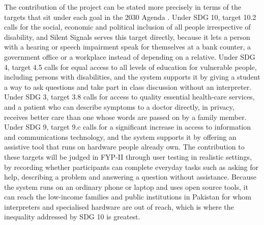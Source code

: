 \documentclass{FastFyp}
\begin{document}
The contribution of the project can be stated more precisely in terms of the targets that sit under each goal in the 2030 Agenda \cite{un2015agenda}. Under SDG 10, target 10.2 calls for the social, economic and political inclusion of all people irrespective of disability, and Silent Signals serves this target directly, because it lets a person with a hearing or speech impairment speak for themselves at a bank counter, a government office or a workplace instead of depending on a relative. Under SDG 4, target 4.5 calls for equal access to all levels of education for vulnerable people, including persons with disabilities, and the system supports it by giving a student a way to ask questions and take part in class discussion without an interpreter. Under SDG 3, target 3.8 calls for access to quality essential health-care services, and a patient who can describe symptoms to a doctor directly, in privacy, receives better care than one whose words are passed on by a family member. Under SDG 9, target 9.c calls for a significant increase in access to information and communications technology, and the system supports it by offering an assistive tool that runs on hardware people already own. The contribution to these targets will be judged in FYP-II through user testing in realistic settings, by recording whether participants can complete everyday tasks such as asking for help, describing a problem and answering a question without assistance. Because the system runs on an ordinary phone or laptop and uses open source tools, it can reach the low-income families and public institutions in Pakistan for whom interpreters and specialised hardware are out of reach, which is where the inequality addressed by SDG 10 is greatest.
\end{document}
